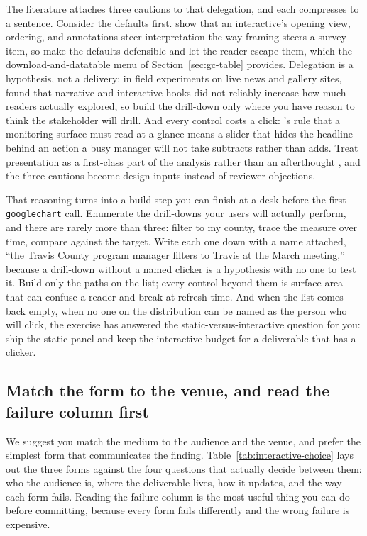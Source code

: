 The literature attaches three cautions to that delegation, and each compresses to a sentence. Consider the defaults first. \textcite{hullman2011rhetoric} show that an interactive's opening view, ordering, and annotations steer interpretation the way framing steers a survey item, so make the defaults defensible and let the reader escape them, which the download-and-datatable menu of Section~\ref{sec:gc-table} provides. Delegation is a hypothesis, not a delivery: in field experiments on live news and gallery sites, \textcite{boy2015storytelling} found that narrative and interactive hooks did not reliably increase how much readers actually explored, so build the drill-down only where you have reason to think the stakeholder will drill. And every control costs a click: \textcite{few2013dashboard}'s rule that a monitoring surface must read at a glance means a slider that hides the headline behind an action a busy manager will not take subtracts rather than adds. Treat presentation as a first-class part of the analysis rather than an afterthought \parencite{kosara2013storytelling}, and the three cautions become design inputs instead of reviewer objections.

That reasoning turns into a build step you can finish at a desk before the first \texttt{googlechart} call. Enumerate the drill-downs your users will actually perform, and there are rarely more than three: filter to my county, trace the measure over time, compare against the target. Write each one down with a name attached, \enquote{the Travis County program manager filters to Travis at the March meeting,} because a drill-down without a named clicker is a hypothesis with no one to test it. Build only the paths on the list; every control beyond them is surface area that can confuse a reader and break at refresh time. And when the list comes back empty, when no one on the distribution can be named as the person who will click, the exercise has answered the static-versus-interactive question for you: ship the static panel and keep the interactive budget for a deliverable that has a clicker.

\subsection{Match the form to the venue, and read the failure column first}\label{ch10-sec:forms}
We suggest you match the medium to the audience and the venue, and prefer the simplest form that communicates the finding. Table~\ref{tab:interactive-choice} lays out the three forms against the four questions that actually decide between them: who the audience is, where the deliverable lives, how it updates, and the way each form fails. Reading the failure column is the most useful thing you can do before committing, because every form fails differently and the wrong failure is expensive.

